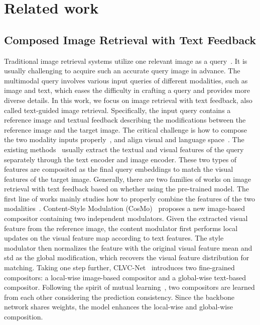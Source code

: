 \documentclass[10pt,twocolumn,letterpaper]{article}
\begin{document}
\section{Related work}


\subsection{Composed Image Retrieval with Text Feedback}
Traditional image retrieval systems utilize one relevant image as a query~\cite{philbin2007object, zheng2020university}. It is usually challenging to acquire such an accurate query image in advance. 
The multimodal query involves various input queries of different modalities, such as image and text, which eases the difficulty in crafting a query and provides more diverse details.  
In this work,  we focus on image retrieval with text feedback, also called text-guided image retrieval. 
Specifically, the input query contains a reference image and textual feedback describing the modifications between the reference image and the target image.
The critical challenge is how to compose the two modality inputs properly~\cite{he-2022-CPL,yang2016stacked,saito2023pic2word,shin2021rtic}, and align visual and language space~\cite{clip,norelli2022asif,saito2023pic2word}.
The existing methods~\cite{2021CoSMo,CLIP4Cir} usually extract the textual and visual features of the query separately through the text encoder and image encoder. These two types of features are composited as the final query embeddings to match the visual features of the target image.
Generally, there are two families of works on image retrieval with text feedback based on whether using the pre-trained model. 
The first line of works mainly studies how to properly combine the features of the two modalities~\cite{qu2021dynamic,han2022fashionvil}.
Content-Style Modulation (CosMo)~\cite{2021CoSMo} proposes a new image-based compositor containing two independent modulators. 
Given the extracted visual feature from the reference image, the content modulator first performs local updates on the visual feature map according to text features.
The style modulator then normalizes the feature with the original visual feature mean and std as the global modification, which recovers the visual feature distribution for matching. 
Taking one step further, CLVC-Net~\cite{CLVC-Net} introduces two fine-grained compositors:
a local-wise image-based compositor and a global-wise text-based compositor. 
Following the spirit of mutual learning~\cite{deep_mutual_learning}, two compositors are learned from each other considering the prediction consistency. Since the backbone network shares weights, the model enhances the local-wise and global-wise composition.  
\end{document}
